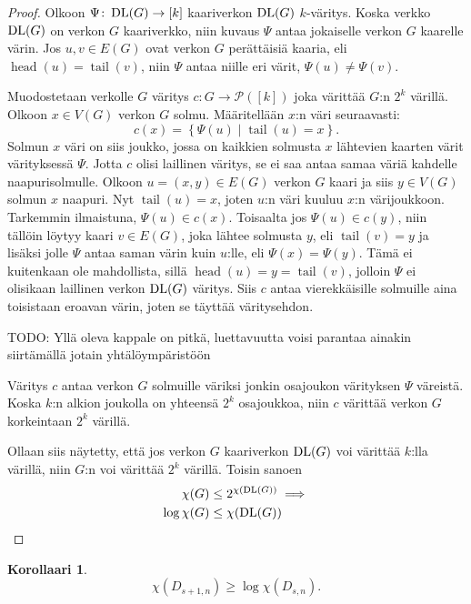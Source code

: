 \documentclass[finnish]{tktltiki2}
\newtheorem{kor}[lau]{Korollaari}
\theoremstyle{definition}
\theoremstyle{remark}
\newcommand{\set}[1]{\left\{ #1 \right\}}
\newcommand{\powerset}{\mathcal{P}}
\newcommand{\from}{\colon}
\DeclareMathOperator{\head}{head}
\DeclareMathOperator{\tail}{tail}
\newcommand{\Dsn}{D_{s,n}}
\newcommand{\Dssn}{D_{s+1,n}}
\begin{document}
\begin{proof}
    Olkoon $\Psi \from \DLG \to [k]$ kaariverkon $\operatorname{DL}(G)$ $k$-väritys. Koska
    verkko $\operatorname{DL}(G)$ on verkon $G$ kaariverkko, niin kuvaus $\Psi$ antaa
    jokaiselle verkon $G$ kaarelle värin. Jos $u, v \in E(G)$ ovat verkon $G$
    perättäisiä kaaria, eli $\head(u) = \tail(v)$, niin $\Psi$ antaa niille eri
    värit, $\Psi(u) \neq \Psi(v)$.

    Muodostetaan verkolle $G$ väritys $c \from G \to \powerset([k])$ joka
    värittää $G$:n $2^k$ värillä. Olkoon $x \in V(G)$ verkon $G$ solmu.
    Määritellään $x$:n väri seuraavasti:
    \begin{equation*}
        c(x) = \set{\Psi(u) \mid \tail(u) = x}.
    \end{equation*}
    Solmun $x$ väri on siis joukko, jossa on kaikkien solmusta $x$ lähtevien
    kaarten värit värityksessä $\Psi$. Jotta $c$ olisi laillinen väritys, se ei
    saa antaa samaa väriä kahdelle naapurisolmulle. Olkoon $u = (x,y) \in E(G)$
    verkon $G$ kaari ja siis $y \in V(G)$ solmun $x$ naapuri. Nyt $\tail(u) =
    x$, joten $u$:n väri kuuluu $x$:n värijoukkoon. Tarkemmin ilmaistuna,
    $\Psi(u) \in c(x)$. Toisaalta jos $\Psi(u) \in c(y)$, niin tällöin löytyy
    kaari $v \in E(G)$, joka lähtee solmusta $y$, eli $\tail(v) = y$ ja lisäksi
    jolle $\Psi$ antaa saman värin kuin $u$:lle, eli $\Psi(x) = \Psi(y)$. Tämä
    ei kuitenkaan ole mahdollista, sillä $\head(u) = y = \tail(v)$, jolloin
    $\Psi$ ei olisikaan laillinen verkon $\operatorname{DL}(G)$ väritys. Siis $c$ antaa
    vierekkäisille solmuille aina toisistaan eroavan värin, joten se täyttää
    väritysehdon.

    TODO: Yllä oleva kappale on pitkä, luettavuutta voisi parantaa ainakin
    siirtämällä jotain yhtälöympäristöön

    Väritys $c$ antaa verkon $G$ solmuille väriksi jonkin osajoukon värityksen
    $\Psi$ väreistä. Koska $k$:n alkion joukolla on yhteensä $2^k$ osajoukkoa,
    niin $c$ värittää verkon $G$ korkeintaan $2^k$ värillä.

    Ollaan siis näytetty, että jos verkon $G$ kaariverkon $\operatorname{DL}(G)$ voi värittää $k$:lla
    värillä, niin $G$:n voi värittää $2^k$ värillä. Toisin sanoen
    \begin{align*}
        \chi(G) &\leq 2^{\chi(\operatorname{DL}(G))} \implies \\
        \log \chi(G) &\leq \chi(\operatorname{DL}(G))
    \end{align*}
\end{proof}

\begin{kor}
    \begin{equation*}
        \chi(\Dssn) \geq \log \chi(\Dsn).
    \end{equation*}
\end{kor}


%
%
% 
%



\end{document}
